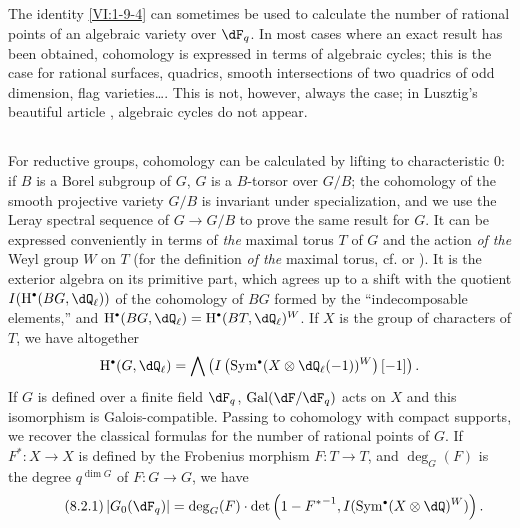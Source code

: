 \subsection{}\label{VI:8-1}

The identity \ref{VI:1-9-4} can sometimes be used to calculate 
the number of rational points of an algebraic variety over $\dF_q$. In 
most cases where an exact result has been obtained, cohomology 
is expressed in terms of algebraic cycles; this is the case for rational 
surfaces, quadrics, smooth intersections of two quadrics of 
odd dimension, flag varieties\ldots. This is not, however, 
always the case; in Lusztig's beautiful article \cite{lu76}, algebraic cycles 
do not appear. 





\subsection{}\label{VI:8-2}

For reductive groups, cohomology can be calculated by lifting to 
characteristic $0$: if $B$ is a Borel subgroup of $G$, $G$ is a 
$B$-torsor over $G/B$; the cohomology of the smooth projective variety 
$G/B$ is invariant under specialization, and we use the Leray spectral sequence 
of $G\to G/B$ to prove the same result for $G$. It can be expressed 
conveniently in terms of \emph{the} maximal torus $T$ of $G$ and the action 
\emph{of the} Weyl group $W$ on $T$ (for the definition \emph{of the} maximal 
torus, cf. \cite[VIII \S 2 Rem.2]{bo05} or \cite[p.105]{dl76}). It is 
the exterior algebra on its primitive part, which agrees up to a shift 
with the quotient $I(\h^\bullet(B G,\dQ_\ell))$ of the cohomology of 
$B G$ formed by the ``indecomposable elements,'' and 
$\h^\bullet(B G,\dQ_\ell)=\h^\bullet(B T,\dQ_\ell)^W$. If $X$ is the group of 
characters of $T$, we have altogether 
\[
  \h^\bullet(G,\dQ_\ell) = \bigwedge \left(I\left(\operatorname{Sym}^\bullet(X\otimes \dQ_\ell(-1))^W\right)[-1]\right) \text{.}
\]
If $G$ is defined over a finite field $\dF_q$, $\gal(\dF/\dF_q)$ acts on $X$ 
and this isomorphism is Galois-compatible. Passing to 
cohomology with compact supports, we recover the classical formulas for the 
number of rational points of $G$. If $F^\ast:X\to X$ is defined by the 
Frobenius morphism $F:T\to T$, and $\deg_G(F)$ is the degree 
$q^{\dim G}$ of $F:G\to G$, we have 
\begin{equation*}\tag{8.2.1}\label{VI:eq:8-2-1}
  \left|G_0(\dF_q)\right| = \deg_G(F) \cdot \det\left(1-{F^\ast}^{-1},I(\operatorname{Sym}^\bullet(X\otimes \dQ)^W)\right) \text{.}
\end{equation*}

